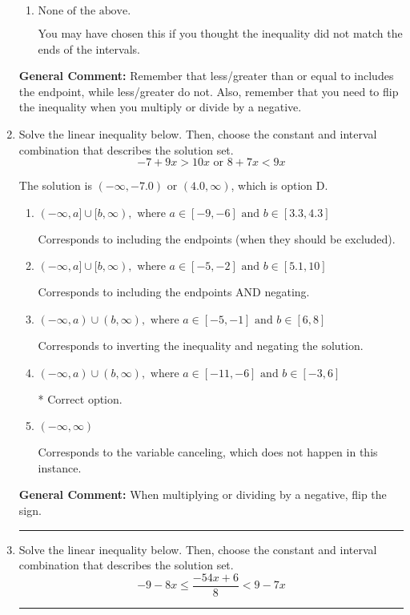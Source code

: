 \documentclass{extbook}[14pt]
\newcommand{\litem}[1]{\item #1

\rule{\textwidth}{0.4pt}}
\begin{document}
\begin{enumerate}
{\begin{enumerate}[label=\Alph*.]
 $(-\infty, -0.118]$, which corresponds to switching the direction of the interval. You likely did this if you did not flip the inequality when dividing by a negative!
\item \( \text{None of the above}. \)

You may have chosen this if you thought the inequality did not match the ends of the intervals.
\end{enumerate}

\textbf{General Comment:} Remember that less/greater than or equal to includes the endpoint, while less/greater do not. Also, remember that you need to flip the inequality when you multiply or divide by a negative.
}
\litem{
Solve the linear inequality below. Then, choose the constant and interval combination that describes the solution set.
\[ -7 + 9 x > 10 x \text{ or } 8 + 7 x < 9 x \]

The solution is \( (-\infty, -7.0) \text{ or } (4.0, \infty) \), which is option D.\begin{enumerate}[label=\Alph*.]
\item \( (-\infty, a] \cup [b, \infty), \text{ where } a \in [-9, -6] \text{ and } b \in [3.3, 4.3] \)

Corresponds to including the endpoints (when they should be excluded).
\item \( (-\infty, a] \cup [b, \infty), \text{ where } a \in [-5, -2] \text{ and } b \in [5.1, 10] \)

Corresponds to including the endpoints AND negating.
\item \( (-\infty, a) \cup (b, \infty), \text{ where } a \in [-5, -1] \text{ and } b \in [6, 8] \)

Corresponds to inverting the inequality and negating the solution.
\item \( (-\infty, a) \cup (b, \infty), \text{ where } a \in [-11, -6] \text{ and } b \in [-3, 6] \)

 * Correct option.
\item \( (-\infty, \infty) \)

Corresponds to the variable canceling, which does not happen in this instance.
\end{enumerate}

\textbf{General Comment:} When multiplying or dividing by a negative, flip the sign.
}
\litem{
Solve the linear inequality below. Then, choose the constant and interval combination that describes the solution set.
\[ -9 - 8 x \leq \frac{-54 x + 6}{8} < 9 - 7 x \]

}
\end{enumerate}
\end{document}
